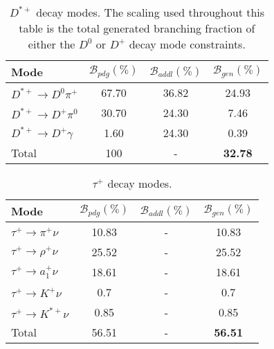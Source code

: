 \documentclass{article}
\renewcommand{\(}{\left(}
\renewcommand{\)}{\right)}
\numberwithin{equation}{section}
\begin{document}
\begin{table}[H]
  \begin{center}
    \begin{tabular}{ l c c c }
      Mode & $\mathcal{B}_{pdg}(\%)$ & $\mathcal{B}_{addl}(\%)$ & $\mathcal{B}_{gen}(\%)$ \\
      \hline\hline
      $D^{*+}\rightarrow D^0\pi^+$ & 67.70 & 36.82 & 24.93 \\
      \hline
      $D^{*+}\rightarrow D^+\pi^0$ & 30.70 & 24.30 & 7.46 \\
      \hline
      $D^{*+}\rightarrow D^+\gamma$ & 1.60 & 24.30 & 0.39 \\
      \hline
      Total & 100 & - & \textbf{32.78} \\
      \hline
    \end{tabular}
  \end{center}
  \caption{$D^{*+}$ decay modes. The scaling used throughout this table is the total generated branching fraction of either the $D^0$ or $D^+$ decay mode constraints.}
\end{table}

\begin{table}[H]
  \begin{center}
    \begin{tabular}{ l c c c }
      Mode & $\mathcal{B}_{pdg}(\%)$ & $\mathcal{B}_{addl}(\%)$ & $\mathcal{B}_{gen}(\%)$ \\
      \hline\hline
      $\tau^+\rightarrow\pi^+\nu$ & 10.83 & - & 10.83 \\
      \hline
      $\tau^+\rightarrow\rho^+\nu$ & 25.52 & - & 25.52 \\
      \hline
      $\tau^+\rightarrow a_1^+\nu$ & 18.61 & - & 18.61 \\
      \hline
      $\tau^+\rightarrow K^+\nu$ & 0.7 & - & 0.7 \\
      \hline
      $\tau^+\rightarrow K^{*+}\nu$ & 0.85 & - & 0.85 \\
      \hline
      Total & 56.51 & - & \textbf{56.51} \\
      \hline
    \end{tabular}
  \end{center}
  \caption{$\tau^{+}$ decay modes.}
\end{table}
\end{document}
